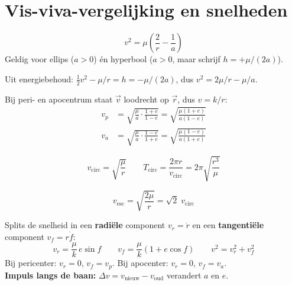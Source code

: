 \documentclass[11pt, a4paper]{article}
\begin{document}
\section{Vis-viva-vergelijking en snelheden}

\begin{formule}
\[
  \boxed{v^2 = \mu\left(\frac{2}{r} - \frac{1}{a}\right)}
\]
Geldig voor ellips ($a>0$) én hyperbool ($a>0$, maar schrijf $h=+\mu/(2a)$).
\end{formule}

\begin{afleiding}[Afleiding]
Uit energiebehoud: $\tfrac{1}{2}v^2 - \mu/r = h = -\mu/(2a)$, dus
$v^2 = 2\mu/r - \mu/a$.
\end{afleiding}

\begin{formule}
Bij peri- en apocentrum staat $\vec{v}$ loodrecht op $\vec{r}$, dus $v = k/r$:
\begin{align}
  v_p &= \sqrt{\frac{\mu}{a}\cdot\frac{1+e}{1-e}} = \sqrt{\frac{\mu(1+e)}{a(1-e)}} \\[6pt]
  v_a &= \sqrt{\frac{\mu}{a}\cdot\frac{1-e}{1+e}} = \sqrt{\frac{\mu(1-e)}{a(1+e)}}
\end{align}
\end{formule}

\begin{formule}[Cirkelbaan ($e = 0$, $r = a = $ const)]
\[
  v_\mathrm{circ} = \sqrt{\frac{\mu}{r}}
  \qquad
  T_\mathrm{circ} = \frac{2\pi r}{v_\mathrm{circ}} = 2\pi\sqrt{\frac{r^3}{\mu}}
\]
\end{formule}

\begin{formule}[Ontsnappingssnelheid (parabolische grens, $h=0$)]
\[
  v_\mathrm{esc} = \sqrt{\frac{2\mu}{r}} = \sqrt{2}\;v_\mathrm{circ}
\]
\end{formule}

\begin{weetje}
Splits de snelheid in een \textbf{radiële} component $v_r = \dot{r}$ en een \textbf{tangentiële} component $v_f = r\dot{f}$:
\[
  v_r = \frac{\mu}{k}\,e\sin f
  \qquad
  v_f = \frac{\mu}{k}(1 + e\cos f)
  \qquad
  v^2 = v_r^2 + v_f^2
\]
Bij pericenter: $v_r = 0$, $v_f = v_p$. \quad Bij apocenter: $v_r = 0$, $v_f = v_a$.\\
\textbf{Impuls langs de baan:} $\Delta v = v_\mathrm{nieuw} - v_\mathrm{oud}$ verandert $a$ en $e$.
\end{weetje}
\end{document}

